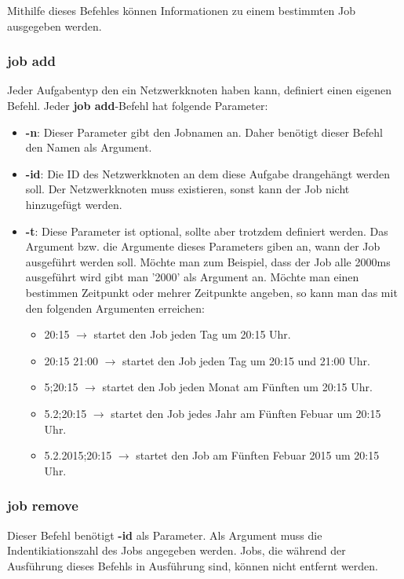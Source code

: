 \documentclass[12pt,a4paper]{report}
\begin{document}
\begin{onehalfspace}
Mithilfe dieses Befehles können Informationen zu einem bestimmten Job ausgegeben werden.

\subsubsection{job add}

Jeder Aufgabentyp den ein Netzwerkknoten haben kann, definiert einen eigenen Befehl. Jeder \textbf{job add}-Befehl hat folgende Parameter:

\begin{itemize}
\item \textbf{-n}: Dieser Parameter gibt den Jobnamen an. Daher benötigt dieser Befehl den Namen als Argument.
\item \textbf{-id}: Die ID des Netzwerkknoten an dem diese Aufgabe drangehängt werden soll. Der Netzwerkknoten muss existieren, sonst kann der Job nicht hinzugefügt werden.
\item \textbf{-t}: Diese Parameter ist optional, sollte aber trotzdem definiert werden. Das Argument bzw. die Argumente dieses Parameters giben an, wann der Job ausgeführt werden soll. Möchte man zum Beispiel, dass der Job alle 2000ms ausgeführt wird gibt man '2000' als Argument an. Möchte man einen bestimmen Zeitpunkt oder mehrer Zeitpunkte angeben, so kann man das mit den folgenden Argumenten erreichen:
  \begin{itemize}
  \item 20:15 $\rightarrow$ startet den Job jeden Tag um 20:15 Uhr.
  \item 20:15 21:00 $\rightarrow$ startet den Job jeden Tag um 20:15 und 21:00 Uhr.
  \item 5;20:15 $\rightarrow$ startet den Job jeden Monat am Fünften um 20:15 Uhr.
  \item 5.2;20:15 $\rightarrow$ startet den Job jedes Jahr am Fünften Febuar um 20:15 Uhr.
  \item 5.2.2015;20:15 $\rightarrow$ startet den Job am Fünften Febuar 2015 um 20:15 Uhr.
  \end{itemize}
\end{itemize}

\subsubsection{job remove}

Dieser Befehl benötigt \textbf{-id} als Parameter. Als Argument muss die Indentikiationszahl des Jobs angegeben werden. Jobs, die während der Ausführung dieses Befehls in Ausführung sind, können nicht entfernt werden.


\end{onehalfspace}
\end{document}
